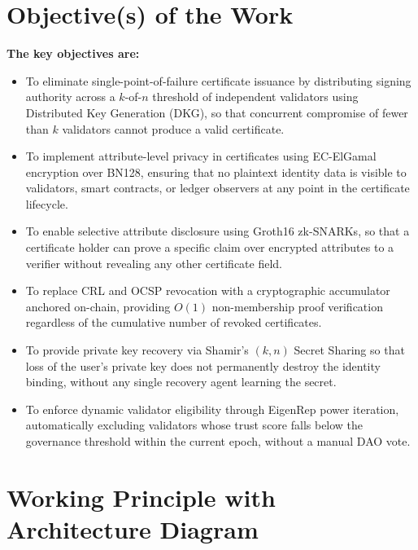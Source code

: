 \documentclass[12pt,a4paper]{article}
\begin{document}
\section{Objective(s) of the Work}

\noindent\textbf{The key objectives are:}
\vspace{0.2cm}
\begin{itemize}[leftmargin=1.5em, itemsep=4pt]
    \item To eliminate single-point-of-failure certificate issuance by distributing signing authority across a $k$-of-$n$ threshold of independent validators using Distributed Key Generation (DKG), so that concurrent compromise of fewer than $k$ validators cannot produce a valid certificate.
    \item To implement attribute-level privacy in certificates using EC-ElGamal encryption over BN128, ensuring that no plaintext identity data is visible to validators, smart contracts, or ledger observers at any point in the certificate lifecycle.
    \item To enable selective attribute disclosure using Groth16 zk-SNARKs, so that a certificate holder can prove a specific claim over encrypted attributes to a verifier without revealing any other certificate field.
    \item To replace CRL and OCSP revocation with a cryptographic accumulator anchored on-chain, providing $O(1)$ non-membership proof verification regardless of the cumulative number of revoked certificates.
    \item To provide private key recovery via Shamir's $(k,n)$ Secret Sharing so that loss of the user's private key does not permanently destroy the identity binding, without any single recovery agent learning the secret.
    \item To enforce dynamic validator eligibility through EigenRep power iteration, automatically excluding validators whose trust score falls below the governance threshold within the current epoch, without a manual DAO vote.
\end{itemize}

\section{Working Principle with Architecture Diagram}
\end{document}
